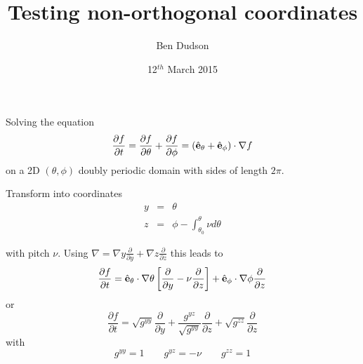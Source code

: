 \documentclass[12pt,a4paper]{article}
\title{ Testing non-orthogonal coordinates }%
\author{ Ben Dudson }%
\date{ 12$^{th}$ March 2015 }%
\begin{document}
\maketitle %
\thispagestyle{fancy}%

Solving the equation
\[
\frac{\partial f}{\partial t} = \frac{\partial f}{\partial \theta} + \frac{\partial f}{\partial \phi} = \left(\hat{\bf{e}}_\theta + \hat{\bf{e}}_\phi\right)\cdot\nabla f
\]
on a 2D $\left(\theta, \phi\right)$ doubly periodic domain with sides of length $2\pi$.

Transform into coordinates
\begin{eqnarray*}
y &=& \theta \\
z &=& \phi - \int_{\theta_0}^\theta \nu d\theta
\end{eqnarray*}

with pitch $\nu$. Using $\nabla = \nabla y \frac{\partial}{\partial y} + \nabla z\frac{\partial}{\partial z}$
this leads to 
\[
\frac{\partial f}{\partial t} = \hat{\bf{e}}_\theta\cdot\nabla\theta \left[\frac{\partial}{\partial y} - \nu \frac{\partial}{\partial z}\right] + \hat{\bf{e}}_\phi\cdot\nabla\phi \frac{\partial}{\partial z}
\]
or
\[
\frac{\partial f}{\partial t} = \sqrt{g^{yy}}\frac{\partial}{\partial y} + \frac{g^{yz}}{\sqrt{g^{yy}}}\frac{\partial}{\partial z} + \sqrt{g^{zz}}\frac{\partial}{\partial z}
\]
with
\[
g^{yy} = 1 \qquad g^{yz} = -\nu \qquad g^{zz} = 1
\]
\end{document}
